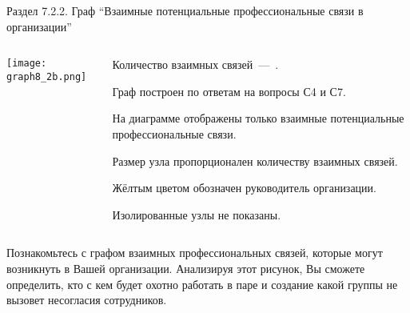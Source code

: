 \begin{frame}{Раздел 7.2.2. Граф ``Взаимные потенциальные профессиональные связи в организации''}

\begin{columns} 
\begin{column}{0.7\textwidth}
\centering
          \texttt{[image: graph8\_2b.png]}
\end{column}
\begin{column}{0.3\textwidth} 

\tiny

Количество взаимных связей~---~\valHBBlinks.
\smallskip

Граф  построен по ответам на вопросы С4 и С7.
\smallskip

\socioSizeComment
\smallskip

На диаграмме отображены только взаимные потенциальные профессиональные связи.
\smallskip

Размер узла пропорционален количеству взаимных связей.
\smallskip

Жёлтым цветом обозначен руководитель организации.
\smallskip

Изолированные узлы не показаны.

\end{column}
\end{columns}

\fontsize{6pt}{7}\selectfont
Познакомьтесь с графом взаимных профессиональных связей, которые могут возникнуть в Вашей организации. 
Анализируя этот рисунок, Вы сможете определить, кто с кем будет охотно работать в паре и 
создание какой группы не вызовет несогласия сотрудников. 


\end{frame}


